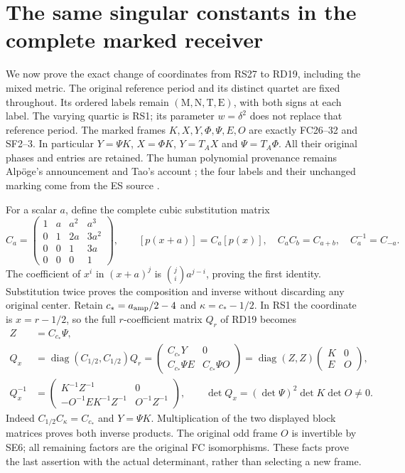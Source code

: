 \section{The same singular constants in the complete marked receiver}
We now prove the exact change of coordinates from RS27 to RD19,
including the mixed metric. The original reference period and its
distinct quartet are fixed throughout. Its ordered labels remain
$(\mathrm M,\mathrm N,\mathrm T,\mathrm E)$, with both signs at
each label. The varying quartic is RS1; its parameter $w=\delta^2$
does not replace that reference period. The marked frames
$K,X,Y,\Phi,\Psi,E,O$ are exactly FC26--32 and SF2--3.
In particular $Y=\Psi K$, $X=\Phi K$, $Y=T_AX$ and
$\Psi=T_A\Phi$. All their original phases and entries are retained.
The human polynomial provenance remains Alp\"oge's announcement
and Tao's account \cite{Tao}; the four labels and their unchanged
marking come from the ES source \cite{ES488}.

For a scalar $a$, define the complete cubic substitution matrix
\begin{equation}
 C_a=\begin{pmatrix}1&a&a^2&a^3\\0&1&2a&3a^2\\
 0&0&1&3a\\0&0&0&1\end{pmatrix},\qquad
 [p(x+a)]=C_a[p(x)],\quad C_aC_b=C_{a+b},\quad C_a^{-1}=C_{-a}.
 \tag{MR1}
\end{equation}
The coefficient of $x^i$ in $(x+a)^j$ is
$\binom ji a^{j-i}$, proving the first identity. Substitution
twice proves the composition and inverse without discarding
any original center. Retain $c_*=a_{\rm amp}/2-4$ and
$\kappa=c_*-1/2$. In RS1 the coordinate is $x=r-1/2$, so
the full $r$-coefficient matrix $Q_r$ of RD19 becomes
\begin{equation}
 \begin{split}
 Z&=C_{c_*}\Psi,\\
 Q_x&=\operatorname{diag}(C_{1/2},C_{1/2})Q_r
   =\begin{pmatrix}C_{c_*}Y&0\\C_{c_*}\Psi E&C_{c_*}\Psi O\end{pmatrix}
   =\operatorname{diag}(Z,Z)\begin{pmatrix}K&0\\E&O\end{pmatrix},\\
 Q_x^{-1}&=\begin{pmatrix}
 K^{-1}Z^{-1}&0\\-O^{-1}EK^{-1}Z^{-1}&O^{-1}Z^{-1}
 \end{pmatrix},\qquad
 \det Q_x=(\det\Psi)^2\det K\det O\ne0.
 \end{split}\tag{MR2}
\end{equation}
Indeed $C_{1/2}C_\kappa=C_{c_*}$ and $Y=\Psi K$.
Multiplication of the two displayed block matrices proves
both inverse products. The original odd frame $O$ is
invertible by SE6; all remaining factors are the original
FC isomorphisms. These facts prove the last assertion with
the actual determinant, rather than selecting a new frame.

